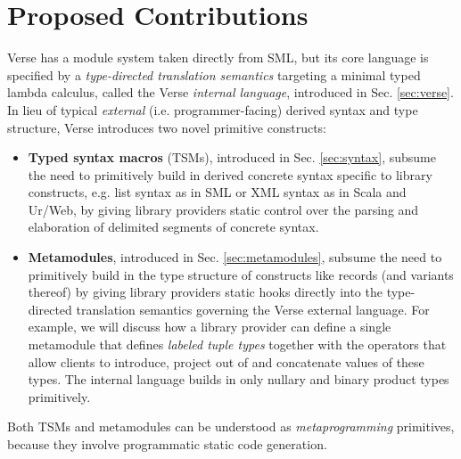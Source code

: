 \section{Proposed Contributions}



Verse has a module system taken directly from SML, but its core language is specified by a \emph{type-directed translation semantics} targeting a minimal typed lambda calculus, called the Verse \emph{internal language}, introduced in Sec. \ref{sec:verse}. In lieu of typical \emph{external} (i.e. programmer-facing) derived syntax and  type structure, Verse introduces two novel primitive constructs:
\begin{itemize}
\item \textbf{Typed syntax macros} (TSMs), introduced in Sec. \ref{sec:syntax}, subsume the need to primitively build in derived concrete syntax specific to library constructs, e.g. list syntax as in SML or XML syntax as in Scala and Ur/Web, by giving library providers static control over the parsing and elaboration of delimited segments of concrete syntax. 
\item \textbf{Metamodules}, introduced in Sec. \ref{sec:metamodules}, subsume the need to primitively build in the type structure of constructs like records (and variants thereof) by giving library providers static hooks directly into the type-directed translation semantics governing the Verse external language. For example, we will discuss how a library provider can define a single metamodule that defines \emph{labeled tuple types} together with the operators that allow clients to introduce, project out of and concatenate values of these types. The internal language builds in only nullary and binary product types primitively.
\end{itemize} 
Both TSMs and metamodules can be understood as \emph{metaprogramming} primitives, because they involve programmatic static code generation. %

